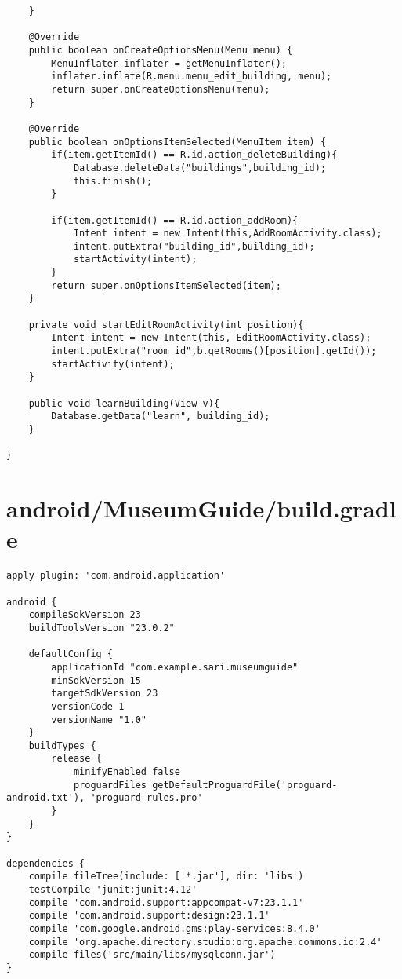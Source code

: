 \begin{lstlisting}
    }

    @Override
    public boolean onCreateOptionsMenu(Menu menu) {
        MenuInflater inflater = getMenuInflater();
        inflater.inflate(R.menu.menu_edit_building, menu);
        return super.onCreateOptionsMenu(menu);
    }

    @Override
    public boolean onOptionsItemSelected(MenuItem item) {
        if(item.getItemId() == R.id.action_deleteBuilding){
            Database.deleteData("buildings",building_id);
            this.finish();
        }

        if(item.getItemId() == R.id.action_addRoom){
            Intent intent = new Intent(this,AddRoomActivity.class);
            intent.putExtra("building_id",building_id);
            startActivity(intent);
        }
        return super.onOptionsItemSelected(item);
    }

    private void startEditRoomActivity(int position){
        Intent intent = new Intent(this, EditRoomActivity.class);
        intent.putExtra("room_id",b.getRooms()[position].getId());
        startActivity(intent);
    }

    public void learnBuilding(View v){
        Database.getData("learn", building_id);
    }

}
\end{lstlisting}
\newpage
\section{android/MuseumGuide/build.gradle}
\begin{lstlisting}apply plugin: 'com.android.application'

android {
    compileSdkVersion 23
    buildToolsVersion "23.0.2"

    defaultConfig {
        applicationId "com.example.sari.museumguide"
        minSdkVersion 15
        targetSdkVersion 23
        versionCode 1
        versionName "1.0"
    }
    buildTypes {
        release {
            minifyEnabled false
            proguardFiles getDefaultProguardFile('proguard-android.txt'), 'proguard-rules.pro'
        }
    }
}

dependencies {
    compile fileTree(include: ['*.jar'], dir: 'libs')
    testCompile 'junit:junit:4.12'
    compile 'com.android.support:appcompat-v7:23.1.1'
    compile 'com.android.support:design:23.1.1'
    compile 'com.google.android.gms:play-services:8.4.0'
    compile 'org.apache.directory.studio:org.apache.commons.io:2.4'
    compile files('src/main/libs/mysqlconn.jar')
}
\end{lstlisting}
\newpage
